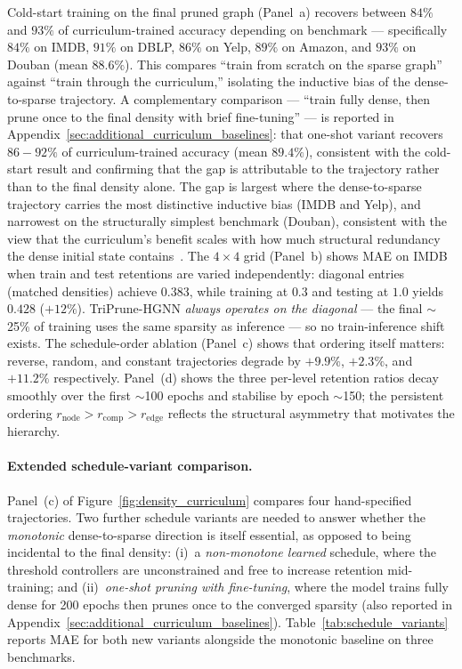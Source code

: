 \documentclass[10pt]{article}
\theoremstyle{plain}
\theoremstyle{definition}
\begin{document}
Cold-start training on the final pruned graph (Panel~a) recovers between $84\%$ and $93\%$ of curriculum-trained accuracy depending on benchmark --- specifically $84\%$ on IMDB, $91\%$ on DBLP, $86\%$ on Yelp, $89\%$ on Amazon, and $93\%$ on Douban (mean $88.6\%$). This compares ``train from scratch on the sparse graph'' against ``train through the curriculum,'' isolating the inductive bias of the dense-to-sparse trajectory. A complementary comparison --- ``train fully dense, then prune once to the final density with brief fine-tuning'' --- is reported in Appendix~\ref{sec:additional_curriculum_baselines}: that one-shot variant recovers $86\!-\!92\%$ of curriculum-trained accuracy (mean $89.4\%$), consistent with the cold-start result and confirming that the gap is attributable to the trajectory rather than to the final density alone. The gap is largest where the dense-to-sparse trajectory carries the most distinctive inductive bias (IMDB and Yelp), and narrowest on the structurally simplest benchmark (Douban), consistent with the view that the curriculum's benefit scales with how much structural redundancy the dense initial state contains~\citep{bengio2009curriculum}. The $4\!\times\!4$ grid (Panel~b) shows MAE on IMDB when train and test retentions are varied independently: diagonal entries (matched densities) achieve $0.383$, while training at $0.3$ and testing at $1.0$ yields $0.428$ ($+12\%$). TriPrune-HGNN \emph{always operates on the diagonal} --- the final $\sim$25\% of training uses the same sparsity as inference --- so no train-inference shift exists. The schedule-order ablation (Panel~c) shows that ordering itself matters: reverse, random, and constant trajectories degrade by $+9.9\%$, $+2.3\%$, and $+11.2\%$ respectively. Panel~(d) shows the three per-level retention ratios decay smoothly over the first $\sim$100 epochs and stabilise by epoch $\sim$150; the persistent ordering $r_{\mathrm{node}}\!>\!r_{\mathrm{comp}}\!>\!r_{\mathrm{edge}}$ reflects the structural asymmetry that motivates the hierarchy.

\paragraph{Extended schedule-variant comparison.} Panel~(c) of Figure~\ref{fig:density_curriculum} compares four hand-specified trajectories. Two further schedule variants are needed to answer whether the \emph{monotonic} dense-to-sparse direction is itself essential, as opposed to being incidental to the final density: (i)~a \emph{non-monotone learned} schedule, where the threshold controllers are unconstrained and free to increase retention mid-training; and (ii)~\emph{one-shot pruning with fine-tuning}, where the model trains fully dense for 200 epochs then prunes once to the converged sparsity (also reported in Appendix~\ref{sec:additional_curriculum_baselines}). Table~\ref{tab:schedule_variants} reports MAE for both new variants alongside the monotonic baseline on three benchmarks.
\end{document}
